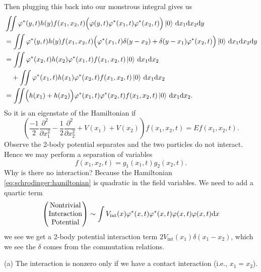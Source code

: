 Then plugging this back into our monstrous integral gives us
\begin{subequations}
\begin{align}
&\iint\varphi^{*}(y,t)h(y)f(x_{1}, x_{2}, t)\Bigl(\varphi(y,t)\varphi^{*}(x_{1},t)\varphi^{*}(x_{2},t)\Bigr)\ket{0}\,\mathrm{d}{x_{1}}\mathrm{d}{x_{2}}\mathrm{d}{y}\\
&=\iint\varphi^{*}(y,t)h(y)f(x_{1}, x_{2}, t)
\Bigl(\varphi^{*}(x_{1},t)\delta(y-x_{2})+\delta(y-x_{1})\varphi^{*}(x_{2},t)\Bigr)
\ket{0}\,\mathrm{d}{x_{1}}\mathrm{d}{x_{2}}\mathrm{d}{y}\nonumber\\
&=\iint\varphi^{*}(x_{2},t)h(x_{2})\varphi^{*}(x_{1},t)f(x_{1},x_{2},t)\ket{0}\,\mathrm{d}{x_{1}}\mathrm{d}{x_{2}}\\
&\quad+
\iint\varphi^{*}(x_{1},t)h(x_{1})\varphi^{*}(x_{2},t)f(x_{1}, x_{2}, t)\ket{0}\,\mathrm{d}{x_{1}}\mathrm{d}{x_{2}}\nonumber\\
&=\iint\Bigl(h(x_{1})+h(x_{2})\Bigr)\varphi^{*}(x_{1},t)\varphi^{*}(x_{2},t)f(x_{1},x_{2},t)\ket{0}\,\mathrm{d}{x_{1}}\mathrm{d}{x_{2}}.
\end{align}
\end{subequations}
So it is an eigenstate of the Hamiltonian if
\begin{equation}
\left(\frac{-1}{2}\frac{\partial^{2}}{\partial x_{1}^{2}}
-\frac{1}{2}\frac{\partial^{2}}{\partial x_{2}^{2}}
+V(x_{1})+V(x_{2})\right)f(x_{1},x_{2},t) = Ef(x_{1},x_{2},t).
\end{equation}
Observe the 2-body potential separates and the two particles do not
interact. Hence we may perform a separation of variables
\begin{equation}
f(x_{1},x_{2},t)=g_{1}(x_{1},t)g_{2}(x_{2},t).
\end{equation}
Why is there no interaction? Because the Hamiltonian \eqref{eq:schrodinger:hamiltonian}
is quadratic in the field variables. We need to add a quartic term
\begin{equation}
\begin{pmatrix}
\mbox{Nontrivial}\\\mbox{Interaction}\\\mbox{Potential}
\end{pmatrix}
\sim\int V_{\text{int}}(x)\varphi^{*}(x,t)\varphi^{*}(x,t)\varphi(x,t)\varphi(x,t)\mathrm{d}{x}
\end{equation}
we see we get a 2-body potential interaction term
$2V_{\text{int}}(x_{1})\delta(x_{1}-x_{2})$, which we see the $\delta$ comes from
the commutation relations.

 (a) The interaction is nonzero only if we have a contact
interaction (i.e., $x_{1}=x_{2}$).

